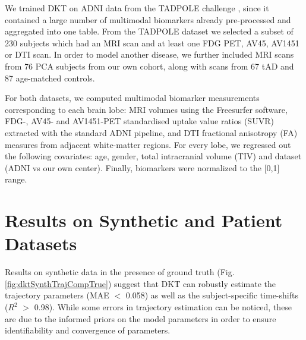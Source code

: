 \documentclass{llncs}
\begin{document}
We trained DKT on ADNI data from the TADPOLE challenge \cite{marinescu2018tadpole}, since it contained a large number of multimodal biomarkers already pre-processed and aggregated into one table. From the TADPOLE dataset we selected a subset of 230 subjects which had an MRI scan and at least one FDG PET, AV45, AV1451 or DTI scan. In order to model another disease, we further included MRI scans from 76 PCA subjects from our own cohort, along with scans from 67 tAD and 87 age-matched controls.
 
For both datasets, we computed multimodal biomarker measurements corresponding to each brain lobe: MRI volumes using the Freesurfer software, FDG-, AV45- and AV1451-PET standardised uptake value ratios (SUVR) extracted with the standard ADNI pipeline, and DTI fractional anisotropy (FA) measures from adjacent white-matter regions. For every lobe, we regressed out the following covariates: age, gender, total intracranial volume (TIV) and dataset (ADNI vs our own center). Finally, biomarkers were normalized to the [0,1] range. 



\section{Results on Synthetic and Patient Datasets}
\label{sec:dktRes}

Results on synthetic data in the presence of ground truth (Fig. \ref{fig:dktSynthTrajCompTrue}) suggest that DKT can robustly estimate the trajectory parameters (MAE $<$ 0.058) as well as the subject-specific time-shifts ($R^2$ $>$ 0.98). While some errors in trajectory estimation can be noticed, these are due to the informed priors on the model parameters in order to ensure identifiability and convergence of parameters.
\end{document}
